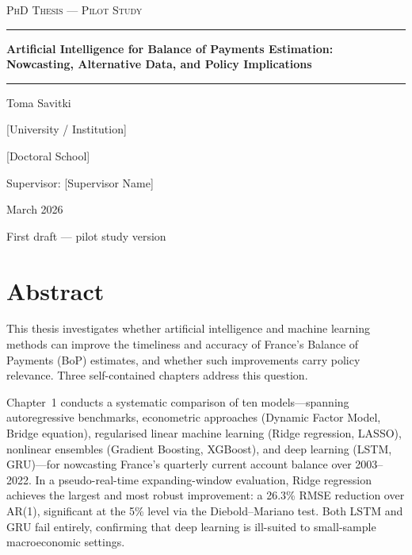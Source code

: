 \documentclass[12pt,a4paper,twoside]{report}
\begin{document}
\begin{titlepage}
\centering
\vspace*{2cm}

{\Large\scshape PhD Thesis --- Pilot Study\par}
\vspace{1cm}
\rule{\textwidth}{1.5pt}\par
\vspace{0.8cm}
{\LARGE\bfseries Artificial Intelligence for Balance of Payments Estimation:\\ Nowcasting, Alternative Data, and Policy Implications\par}
\vspace{0.8cm}
\rule{\textwidth}{1.5pt}\par
\vspace{2cm}

{\Large Toma Savitki\par}
\vspace{1cm}
{\large [University / Institution]\par}
\vspace{0.5cm}
{\large [Doctoral School]\par}
\vspace{2cm}
{\large Supervisor: [Supervisor Name]\par}
\vspace{2cm}
{\large March 2026\par}

\vfill
{\small First draft --- pilot study version\par}
\end{titlepage}

\chapter*{Abstract}

This thesis investigates whether artificial intelligence and machine learning methods can improve the timeliness and accuracy of France's Balance of Payments (BoP) estimates, and whether such improvements carry policy relevance.  Three self-contained chapters address this question.

Chapter~1 conducts a systematic comparison of ten models---spanning autoregressive benchmarks, econometric approaches (Dynamic Factor Model, Bridge equation), regularised linear machine learning (Ridge regression, LASSO), nonlinear ensembles (Gradient Boosting, XGBoost), and deep learning (LSTM, GRU)---for nowcasting France's quarterly current account balance over 2003--2022.  In a pseudo-real-time expanding-window evaluation, Ridge regression achieves the largest and most robust improvement: a 26.3\% RMSE reduction over AR(1), significant at the 5\% level via the Diebold--Mariano test.  Both LSTM and GRU fail entirely, confirming that deep learning is ill-suited to small-sample macroeconomic settings.
\end{document}
